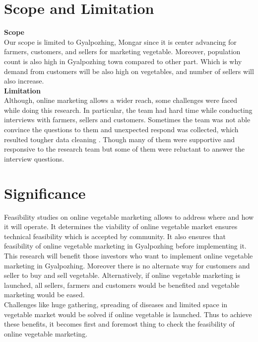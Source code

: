 \documentclass[12pt]{report}
\begin{document}
\begin{normalsize}

\section{Scope and Limitation}
{\bfseries Scope }\newline\\
Our scope is limited to Gyalpozhing, Mongar since it is center advancing for farmers, customers, and sellers for marketing vegetable. Moreover, population count is also high in Gyalpozhing town compared to other part. Which is why demand from customers will be also high on vegetables, and number of sellers will also increase. \newline\\[0.1cm]
{\bfseries Limitation }\newline\\
Although, online marketing allows a wider reach, some challenges were faced while doing this research. In particular, the team had hard time while conducting interviews with farmers, sellers and customers. Sometimes the team was not able convince the questions to them and unexpected respond was collected, which resulted tougher data cleaning . Though many of them were supportive and responsive to the research team but some of them were reluctant to answer the interview questions.



\section{Significance}

Feasibility studies on online vegetable marketing allows to address where and how it will operate. It determines the viability of online vegetable market ensures technical feasibility which is accepted by community. It also ensures that feasibility of online vegetable marketing in Gyalpozhing before implementing it. This research will benefit those investors who want to implement online vegetable marketing in Gyalpozhing. Moreover there is no alternate way for customers and seller to buy and sell vegetable.  Alternatively, if online vegetable marketing is launched, all sellers, farmers and customers would be benefited and vegetable marketing would be eased.\newline\\[0.1cm]
Challenges like huge gathering, spreading of diseases and limited space in vegetable market would be solved if online vegetable is launched. Thus to achieve these benefits, it becomes first and foremost thing to check the feasibility of online vegetable marketing.









\end{normalsize}
\end{document}
